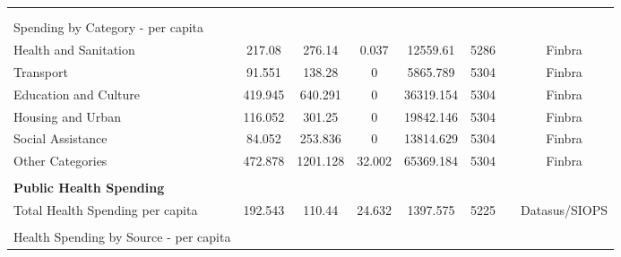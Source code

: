 \begin{table}[H]
\begin{footnotesize}
\begin{center}
{\begin{threeparttable}[b]
\begin{tabular}{rrrrrrrr}
          &       &       &       &       &       &       &  \\
          &       &       &       &       &       &       &  \\
    \multicolumn{1}{l}{Spending by Category - per capita} &       &       &       &       &       &       &  \\
    \multicolumn{1}{l}{Health and Sanitation} & \multicolumn{1}{c}{217.08} & \multicolumn{1}{c}{276.14} & \multicolumn{1}{c}{0.037} & \multicolumn{1}{c}{12559.61} & \multicolumn{1}{c}{5286} &       & \multicolumn{1}{c}{Finbra} \\
    \multicolumn{1}{l}{Transport} & \multicolumn{1}{c}{91.551} & \multicolumn{1}{c}{138.28} & \multicolumn{1}{c}{0} & \multicolumn{1}{c}{5865.789} & \multicolumn{1}{c}{5304} &       & \multicolumn{1}{c}{Finbra} \\
    \multicolumn{1}{l}{Education and Culture} & \multicolumn{1}{c}{419.945} & \multicolumn{1}{c}{640.291} & \multicolumn{1}{c}{0} & \multicolumn{1}{c}{36319.154} & \multicolumn{1}{c}{5304} &       & \multicolumn{1}{c}{Finbra} \\
    \multicolumn{1}{l}{Housing and Urban} & \multicolumn{1}{c}{116.052} & \multicolumn{1}{c}{301.25} & \multicolumn{1}{c}{0} & \multicolumn{1}{c}{19842.146} & \multicolumn{1}{c}{5304} &       & \multicolumn{1}{c}{Finbra} \\
    \multicolumn{1}{l}{Social Assistance} & \multicolumn{1}{c}{84.052} & \multicolumn{1}{c}{253.836} & \multicolumn{1}{c}{0} & \multicolumn{1}{c}{13814.629} & \multicolumn{1}{c}{5304} &       & \multicolumn{1}{c}{Finbra} \\
    \multicolumn{1}{l}{Other Categories} & \multicolumn{1}{c}{472.878} & \multicolumn{1}{c}{1201.128} & \multicolumn{1}{c}{32.002} & \multicolumn{1}{c}{65369.184} & \multicolumn{1}{c}{5304} &       & \multicolumn{1}{c}{Finbra} \\
          &       &       &       &       &       &       &  \\
    \multicolumn{1}{l}{\textbf{Public Health Spending}} &       &       &       &       &       &       &  \\
    \multicolumn{1}{l}{Total Health Spending per capita} & \multicolumn{1}{c}{192.543} & \multicolumn{1}{c}{110.44} & \multicolumn{1}{c}{24.632} & \multicolumn{1}{c}{1397.575} & \multicolumn{1}{c}{5225} &       & \multicolumn{1}{c}{Datasus/SIOPS} \\
          &       &       &       &       &       &       &  \\
    \multicolumn{1}{l}{Health Spending by Source - per capita} &       &       &       &       &       &       &  \\

\end{tabular}
\end{threeparttable}}
\end{center}
\end{footnotesize}
\end{table}

